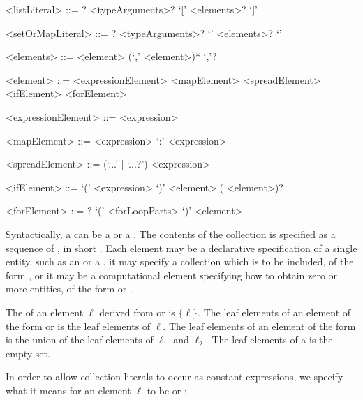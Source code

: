 \documentclass[makeidx]{article}
\begin{document}
{\begin{grammar}
<listLiteral> ::= \CONST{}? <typeArguments>? `[' <elements>? `]'

<setOrMapLiteral> ::= \CONST{}? <typeArguments>? `{' <elements>? `}'

<elements> ::= <element> (`,' <element>)* `,'?

<element> ::= <expressionElement>
  \alt <mapElement>
  \alt <spreadElement>
  \alt <ifElement>
  \alt <forElement>

<expressionElement> ::= <expression>

<mapElement> ::= <expression> `:' <expression>

<spreadElement> ::= (`...' | `...?') <expression>

<ifElement> ::= \IF{} `(' <expression> `)' <element> (\ELSE{} <element>)?

<forElement> ::= \AWAIT{}? \FOR{} `(' <forLoopParts> `)' <element>
\end{grammar}

\LMHash{}%
Syntactically, a  can be
a  or a .
The contents of the collection is specified as a sequence of
,
in short .
Each element may be a declarative specification of a single entity,
such as an  or a ,
it may specify a collection which is to be included,
of the form ,
or it may be a computational element specifying
how to obtain zero or more entities,
of the form  or .


\LMHash{}%
The  of an element $\ell$ derived from
 or 
is $\{\ell\}$.
The leaf elements of an element of the form
 or
is the leaf elements of $\ell$.
The leaf elements of an element of the form
is the union of the leaf elements of $\ell_1$ and $\ell_2$.
The leaf elements of a  is the empty set.


\LMHash{}%
In order to allow collection literals to occur as constant expressions,
we specify what it means for an element $\ell$
to be
or
:

}
\end{document}
